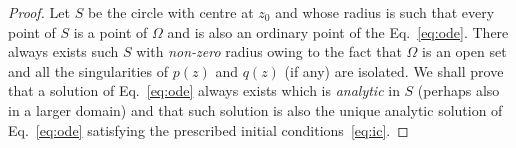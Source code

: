 \begin{proof}

   Let 
   $S$ be the circle with centre at $z_{0}$ and whose radius is  such that every
   point of $S$ is a point of $\Omega$ and is also an ordinary point of the
   Eq.~\eqref{eq:ode}.  There always exists such $S$  with \emph{non-zero} radius
   owing to the fact that $\Omega$ is an open set and all the singularities of
   $p(z)$ and $q(z)$  (if any) are isolated.  We shall prove that a solution of
   Eq.~\eqref{eq:ode} always exists which is \emph{analytic} in $S$ (perhaps also
   in a larger domain) and that such solution is also the unique analytic solution
   of Eq.~\eqref{eq:ode} satisfying the prescribed initial
   conditions~\eqref{eq:ic}.


\end{proof}
